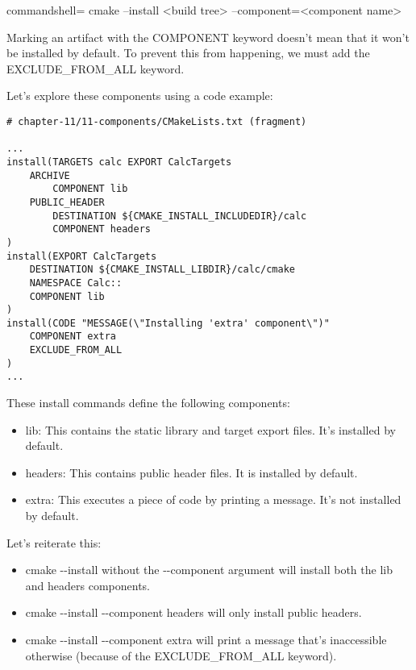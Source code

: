 \begin{tcblisting}{commandshell={}}
cmake --install <build tree> --component=<component name>
\end{tcblisting}

Marking an artifact with the COMPONENT keyword doesn't mean that it won't be installed by default. To prevent this from happening, we must add the EXCLUDE\_FROM\_ALL keyword.

Let's explore these components using a code example:

\begin{lstlisting}[style=styleCMake]
# chapter-11/11-components/CMakeLists.txt (fragment)

...
install(TARGETS calc EXPORT CalcTargets
	ARCHIVE
		COMPONENT lib
	PUBLIC_HEADER
		DESTINATION ${CMAKE_INSTALL_INCLUDEDIR}/calc
		COMPONENT headers
)
install(EXPORT CalcTargets
	DESTINATION ${CMAKE_INSTALL_LIBDIR}/calc/cmake
	NAMESPACE Calc::
	COMPONENT lib
)
install(CODE "MESSAGE(\"Installing 'extra' component\")"
	COMPONENT extra
	EXCLUDE_FROM_ALL
)
...
\end{lstlisting}

These install commands define the following components:

\begin{itemize}
\item 
lib: This contains the static library and target export files. It's installed by default.

\item 
headers: This contains public header files. It is installed by default.

\item 
extra: This executes a piece of code by printing a message. It's not installed by default.
\end{itemize}

Let's reiterate this:

\begin{itemize}
\item 
cmake -{}-install without the -{}-component argument will install both the lib and headers components.

\item 
cmake -{}-install -{}-component headers will only install public headers.

\item 
cmake -{}-install -{}-component extra will print a message that's inaccessible otherwise (because of the EXCLUDE\_FROM\_ALL keyword).
\end{itemize}

